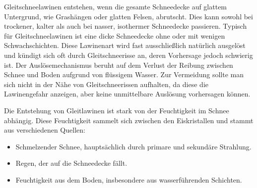 Gleitschneelawinen entstehen, wenn die gesamte Schneedecke auf glattem Untergrund, wie Grashängen oder glatten Felsen, abrutscht. Dies kann sowohl bei trockener, kalter als auch bei nasser, isothermer Schneedecke passieren. Typisch für Gleitschneelawinen ist eine dicke Schneedecke ohne oder mit wenigen Schwachschichten. Diese Lawinenart wird fast ausschließlich natürlich ausgelöst und kündigt sich oft durch Gleitschneerisse an, deren Vorhersage jedoch schwierig ist.  Der Auslösemechanismus beruht auf dem Verlust der Reibung zwischen Schnee und Boden aufgrund von flüssigem Wasser. Zur Vermeidung sollte man sich nicht in der Nähe von Gleitschneerissen aufhalten, da diese die Lawinengefahr anzeigen, aber keine unmittelbare Auslösung vorhersagen können.

Die Entstehung von Gleitlawinen ist stark von der Feuchtigkeit im Schnee abhängig. Diese Feuchtigkeit sammelt sich zwischen den Eiskristallen und stammt aus verschiedenen Quellen:
\begin{itemize}
    \item Schmelzender Schnee, hauptsächlich durch primare und sekundäre Strahlung.
    \item Regen, der auf die Schneedecke fällt.
    \item Feuchtigkeit aus dem Boden, insbesondere aus wasserführenden Schichten.
\end{itemize}
